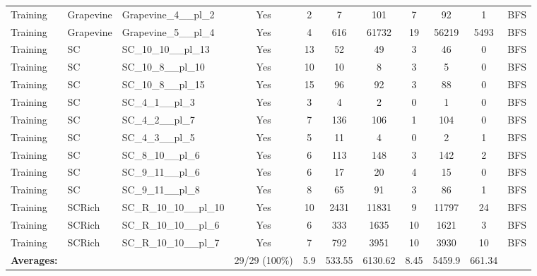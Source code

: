 \documentclass{article}
\begin{document}
\begin{tabular}{lllcccccccc}
Training & Grapevine & Grapevine\_4\_\_pl\_2 & Yes & 2 & 7 & 101 & 7 & 92 & 1 & BFS \\
Training & Grapevine & Grapevine\_5\_\_pl\_4 & Yes & 4 & 616 & 61732 & 19 & 56219 & 5493 & BFS \\
Training & SC & SC\_10\_10\_\_pl\_13 & Yes & 13 & 52 & 49 & 3 & 46 & 0 & BFS \\
Training & SC & SC\_10\_8\_\_pl\_10 & Yes & 10 & 10 & 8 & 3 & 5 & 0 & BFS \\
Training & SC & SC\_10\_8\_\_pl\_15 & Yes & 15 & 96 & 92 & 3 & 88 & 0 & BFS \\
Training & SC & SC\_4\_1\_\_pl\_3 & Yes & 3 & 4 & 2 & 0 & 1 & 0 & BFS \\
Training & SC & SC\_4\_2\_\_pl\_7 & Yes & 7 & 136 & 106 & 1 & 104 & 0 & BFS \\
Training & SC & SC\_4\_3\_\_pl\_5 & Yes & 5 & 11 & 4 & 0 & 2 & 1 & BFS \\
Training & SC & SC\_8\_10\_\_pl\_6 & Yes & 6 & 113 & 148 & 3 & 142 & 2 & BFS \\
Training & SC & SC\_9\_11\_\_pl\_6 & Yes & 6 & 17 & 20 & 4 & 15 & 0 & BFS \\
Training & SC & SC\_9\_11\_\_pl\_8 & Yes & 8 & 65 & 91 & 3 & 86 & 1 & BFS \\
Training & SCRich & SC\_R\_10\_10\_\_pl\_10 & Yes & 10 & 2431 & 11831 & 9 & 11797 & 24 & BFS \\
Training & SCRich & SC\_R\_10\_10\_\_pl\_6 & Yes & 6 & 333 & 1635 & 10 & 1621 & 3 & BFS \\
Training & SCRich & SC\_R\_10\_10\_\_pl\_7 & Yes & 7 & 792 & 3951 & 10 & 3930 & 10 & BFS \\
\textbf{Averages:} & & & 29/29 (100\%) & 5.9 & 533.55 & 6130.62 & 8.45 & 5459.9 & 661.34 & \\
\bottomrule
\end{tabular}
\newpage
\end{document}
